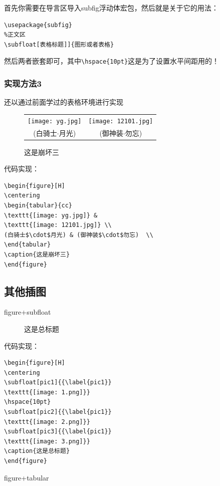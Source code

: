 \documentclass[cn,chinese,color=cyan]{elegantbook}
\begin{document}
首先你需要在导言区导入subfig浮动体宏包，然后就是关于它的用法：
\begin{lstlisting}[style=R]
%导言区
\usepackage{subfig}
%正文区
\subfloat[表格标题]]{图形或者表格}
\end{lstlisting}
然后两者嵌套即可，其中\verb|\hspace{10pt}|这是为了设置水平间距用的！

\subsubsection{实现方法3}
还以通过前面学过的表格环境进行实现
\begin{figure}[H]
	\centering
	\begin{tabular}{cc}
		\texttt{[image: yg.jpg]} &
		\texttt{[image: 12101.jpg]} \\
		(白骑士$\cdot$月光) & (御神装$\cdot$勿忘)  \\
	\end{tabular}
	\caption{这是崩坏三}
\end{figure}
代码实现：
\begin{lstlisting}[style=R]
\begin{figure}[H]
\centering
\begin{tabular}{cc}
\texttt{[image: yg.jpg]} &
\texttt{[image: 12101.jpg]} \\
(白骑士$\cdot$月光) & (御神装$\cdot$勿忘)  \\
\end{tabular}
\caption{这是崩坏三}
\end{figure}
\end{lstlisting}
\subsection{其他插图}
\begin{center}
figure+subfloat
\end{center}

\begin{figure}[H]
	\centering
	\hspace{10pt}
	\caption{这是总标题}
\end{figure}
代码实现：
\begin{lstlisting}[style=R]
\begin{figure}[H]
\centering
\subfloat[pic1]{{\label{pic1}}
\texttt{[image: 1.png]}}
\hspace{10pt}
\subfloat[pic2]{{\label{pic1}}
\texttt{[image: 2.png]}}
\subfloat[pic3]{{\label{pic1}}
\texttt{[image: 3.png]}}
\caption{这是总标题}
\end{figure}
\end{lstlisting}
\begin{center}
figure+tabular
\end{center}
\end{document}
